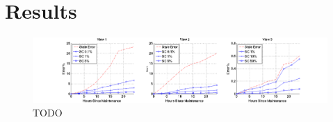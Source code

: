 \section{Results}

\begin{figure}[h]
\label{conviva}
\centering
 \includegraphics[width=\textwidth]{exp/exp1-conviva1.png}
 \caption{TODO}
\end{figure}